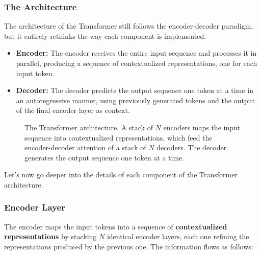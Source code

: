 \subsubsection{The Architecture}
The architecture of the Transformer still follows the encoder-decoder paradigm, but it entirely rethinks the way each component is implemented.

\begin{itemize}
    \item \textbf{Encoder:} The encoder receives the entire input sequence and processes it in parallel, producing a sequence of contextualized representations, one for each input token.
    \item \textbf{Decoder:} The decoder predicts the output sequence one token at a time in an autoregressive manner, using previously generated tokens and the output of the final encoder layer as context.
\end{itemize}

\begin{figure}[H]
    \centering
    \resizebox{0.85\textwidth}{!}{}
    \caption{The Transformer architecture. A stack of $N$ encoders maps the input sequence into contextualized representations, which feed the encoder-decoder attention of a stack of $N$ decoders. The decoder generates the output sequence one token at a time.}
\end{figure}

Let's now go deeper into the details of each component of the Transformer architecture.

\subsubsection{Encoder Layer}
The encoder maps the input tokens into a sequence of \textbf{contextualized representations} by stacking $N$ identical encoder layers, each one refining the representations produced by the previous one. The information flows as follows:

